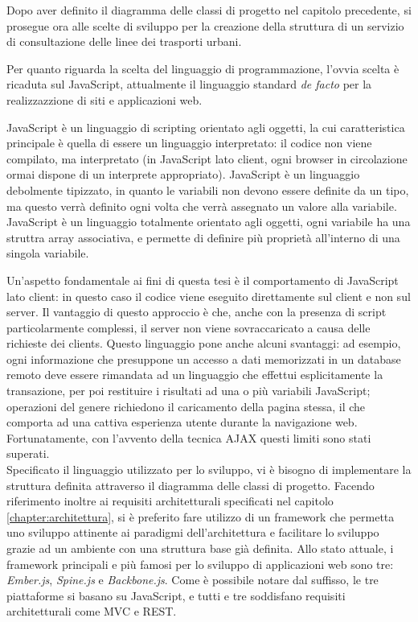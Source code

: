 Dopo aver definito il diagramma delle classi di progetto nel capitolo precedente, si prosegue ora alle scelte di sviluppo per la creazione della struttura di un servizio di consultazione delle linee dei trasporti urbani.

Per quanto riguarda la scelta del linguaggio di programmazione, l'ovvia scelta è ricaduta sul JavaScript, attualmente il linguaggio standard {\itshape de facto} per la realizzazzione di siti e applicazioni web.

JavaScript è un linguaggio di scripting orientato agli oggetti, la cui caratteristica principale è quella di essere un linguaggio interpretato: il codice non viene compilato, ma interpretato (in JavaScript lato client, ogni browser in circolazione ormai dispone di un interprete appropriato).
JavaScript è un linguaggio debolmente tipizzato, in quanto le variabili non devono essere definite da un tipo, ma questo verrà definito ogni volta che verrà assegnato un valore alla variabile. JavaScript è un linguaggio totalmente orientato agli oggetti, ogni variabile ha una struttra array associativa, e permette di definire più proprietà all'interno di una singola variabile.

Un'aspetto fondamentale ai fini di questa tesi è il comportamento di JavaScript lato client: in questo caso il codice viene eseguito direttamente sul client e non sul server. Il vantaggio di questo approccio è che, anche con la presenza di script particolarmente complessi, il server non viene sovraccaricato a causa delle richieste dei clients. Questo linguaggio pone anche alcuni svantaggi: ad esempio, ogni informazione che presuppone un accesso a dati memorizzati in un database remoto deve essere rimandata ad un linguaggio che effettui esplicitamente la transazione, per poi restituire i risultati ad una o più variabili JavaScript; operazioni del genere richiedono il caricamento della pagina stessa, il che comporta ad una cattiva esperienza utente durante la navigazione web. Fortunatamente, con l'avvento della tecnica AJAX questi limiti sono stati superati.\\

Specificato il linguaggio utilizzato per lo sviluppo, vi è bisogno di implementare la struttura definita attraverso il diagramma delle classi di progetto. Facendo riferimento inoltre ai requisiti architetturali specificati nel capitolo \ref{chapter:architettura}, si è preferito fare utilizzo di un framework che permetta uno sviluppo attinente ai paradigmi dell'architettura e facilitare lo sviluppo grazie ad un ambiente con una struttura base già definita.
Allo stato attuale, i framework principali e più famosi per lo sviluppo di applicazioni web sono tre: {\itshape Ember.js}, {\itshape Spine.js} e {\itshape Backbone.js}. Come è possibile notare dal suffisso, le tre piattaforme si basano su JavaScript, e tutti e tre soddisfano requisiti architetturali come MVC e REST.

